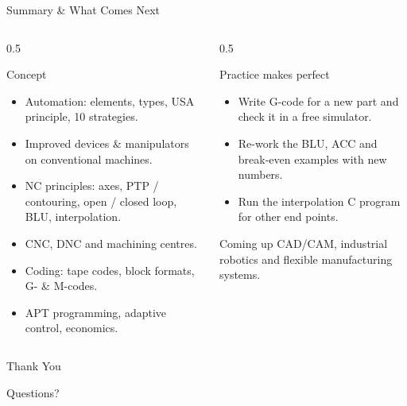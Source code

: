 \documentclass[aspectratio=169]{beamer}
\begin{document}
	\begin{frame}{Summary \& What Comes Next}
		\begin{columns}[T]
			\begin{column}{0.5\textwidth}
				\begin{block}{Concept}
					\begin{itemize}\small
						\item Automation: elements, types, USA principle, 10 strategies.
						\item Improved devices \& manipulators on conventional machines.
						\item NC principles: axes, PTP / contouring, open / closed loop, BLU, interpolation.
						\item CNC, DNC and machining centres.
						\item Coding: tape codes, block formats, G- \& M-codes.
						\item APT programming, adaptive control, economics.
					\end{itemize}
				\end{block}
			\end{column}
			\begin{column}{0.5\textwidth}
				\begin{block}{Practice makes perfect}
					\begin{itemize}\small
						\item Write G-code for a new part and check it in a free simulator.
						\item Re-work the BLU, ACC and break-even examples with new numbers.
						\item Run the interpolation C program for other end points.
					\end{itemize}
				\end{block}
				\begin{block}{Coming up}
					\small CAD/CAM, industrial robotics and flexible manufacturing systems.
				\end{block}
			\end{column}
		\end{columns}
	\end{frame}

	\begin{frame}
		\centering
		\Huge Thank You
		\vspace{0.5cm}

		\normalsize Questions?
	\end{frame}

\end{document}
